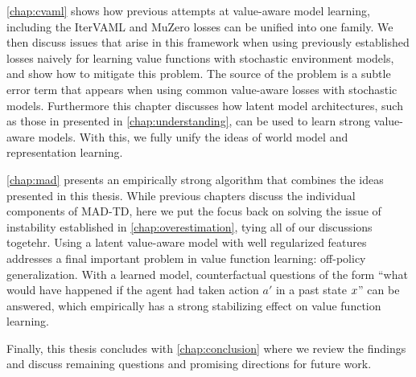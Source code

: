 \autoref{chap:cvaml} shows how previous attempts at value-aware model learning, including the IterVAML \parencite{itervaml} and MuZero \parencite{schrittwieser2020mastering} losses can be unified into one family. 
We then discuss issues that arise in this framework when using previously established losses naively for learning value functions with stochastic environment models, and show how to mitigate this problem.
The source of the problem is a subtle error term that appears when using common value-aware losses with stochastic models.
Furthermore this chapter discusses how latent model architectures, such as those in presented in \autoref{chap:understanding}, can be used to learn strong value-aware models.
With this, we fully unify the ideas of world model and representation learning.

\autoref{chap:mad} presents an empirically strong algorithm that combines the ideas presented in this thesis.
While previous chapters discuss the individual components of MAD-TD, here we put the focus back on solving the issue of instability established in \autoref{chap:overestimation}, tying all of our discussions togetehr.
Using a latent value-aware model with well regularized features addresses a final important problem in value function learning: off-policy generalization.
With a learned model, counterfactual questions of the form ``what would have happened if the agent had taken action $a'$ in a past state $x$'' can be answered, which empirically has a strong stabilizing effect on value function learning.

Finally, this thesis concludes with \autoref{chap:conclusion} where we review the findings and discuss remaining questions and promising directions for future work.


